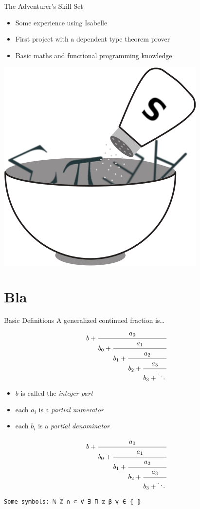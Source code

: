 \documentclass{beamer}
\begin{document}
\begin{frame}{The Adventurer's Skill Set}
\pause
\begin{itemize}[<+->]
\item Some experience using Isabelle
\item First project with a dependent type theorem prover
\item Basic maths and functional programming knowledge
\end{itemize}
\end{frame}
\begin{frame}
    \centering\includegraphics[height=0.8\textheight]{img/salt_shaker.png}
\end{frame}
\section{Bla}
\begin{frame}{Basic Definitions}
A generalized continued fraction is\dots
\pause
\begin{equation*}
b + \cfrac{a_0}{b_0 + \cfrac{a_1}{b_1 + \cfrac{a_2}{b_2 + \cfrac{a_3}{b_3 + \ddots\,}}}}
\end{equation*}
\pause
\begin{itemize}[<+->]
\item $b$ is called the \emph{integer part}
\item each $a_i$ is a \emph{partial numerator}
\item each $b_i$ is a \emph{partial denominator}
\end{itemize}
\end{frame}
\begin{frame}
\begin{equation*}
b + \cfrac{a_0}{b_0 + \cfrac{a_1}{b_1 + \cfrac{a_2}{b_2 + \cfrac{a_3}{b_3 + \ddots\,}}}}
\end{equation*}
\begin{lstlisting}
Some symbols: ℕ ℤ ∩ ⊂ ∀ ∃ Π α β γ ∈ ⦃ ⦄
\end{lstlisting}
\end{frame}
\end{document}
